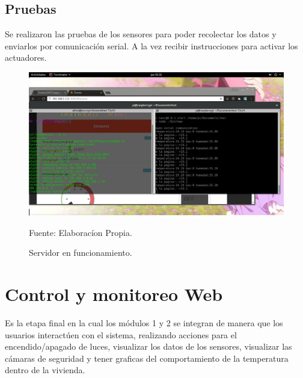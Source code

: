 \documentclass[11pt,letterpaper]{report}
\begin{document}
		\subsection{Pruebas}
		Se realizaron las pruebas de los sensores para  poder recolectar los datos y  enviarlos por comunicación serial. A la vez recibir instrucciones para activar los actuadores.
		
		
		\begin{figure}[ht]
			\centering
			\includegraphics[scale=0.44]{imagenes/start_serever.png}
			\caption{Servidor en funcionamiento.}
			 Fuente: Elaboracíon Propia.
			\label{servidorStart} 
		\end{figure}
		\section{Control y monitoreo Web}
		Es la etapa final en la cual los módulos 1 y 2 se integran de manera  que los usuarios interactúen con el sistema, realizando acciones para el encendido/apagado de luces, visualizar los datos de los sensores, visualizar las cámaras de seguridad y tener graficas del comportamiento de la temperatura dentro de la vivienda.
		
\end{document}
